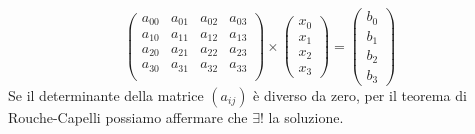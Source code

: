 \documentclass[10pt,a4paper]{article}
\begin{document}
\[\begin{pmatrix}
a_{0 0}&a_{0 1}&a_{0 2}&a_{0 3}\\
a_{1 0}&a_{1 1}&a_{1 2}&a_{1 3}\\
a_{2 0}&a_{2 1}&a_{2 2}&a_{2 3}\\
a_{3 0}&a_{3 1}&a_{3 2}&a_{3 3}\\
\end{pmatrix}
 \times 
 \begin{pmatrix}
 x_0\\
 x_1\\
 x_2\\
 x_3 
 \end{pmatrix}=
 \begin{pmatrix}
b_0\\
b_1\\
b_2\\
b_3
 \end{pmatrix}
 \]
 Se il determinante della matrice $ (a_{ij}) $ è diverso da zero, per il teorema di Rouche-Capelli possiamo affermare che $ \exists ! $ la soluzione.
\end{document}
